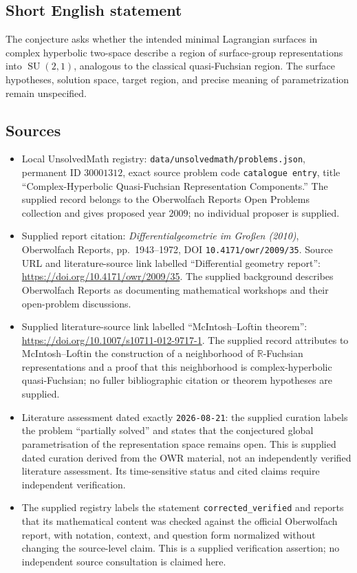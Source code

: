 \documentclass[11pt]{article}
\newcommand{\R}{\mathbb{R}}
\begin{document}
\subsection{Short English statement}
The conjecture asks whether the intended minimal Lagrangian surfaces in complex hyperbolic two-space describe a region of surface-group representations into \(\operatorname{SU}(2,1)\), analogous to the classical quasi-Fuchsian region. The surface hypotheses, solution space, target region, and precise meaning of parametrization remain unspecified.
\subsection{Sources}
\begin{itemize}
\item Local UnsolvedMath registry: \texttt{data/unsolvedmath/problems.json}, permanent ID \(30001312\), exact source problem code \texttt{catalogue entry}, title ``Complex-Hyperbolic Quasi-Fuchsian Representation Components.'' The supplied record belongs to the Oberwolfach Reports Open Problems collection and gives proposed year \(2009\); no individual proposer is supplied.
\item Supplied report citation: \emph{Differentialgeometrie im Großen (2010)}, Oberwolfach Reports, pp.~1943--1972, DOI \texttt{10.4171/owr/2009/35}. Source URL and literature-source link labelled ``Differential geometry report'': \url{https://doi.org/10.4171/owr/2009/35}. The supplied background describes Oberwolfach Reports as documenting mathematical workshops and their open-problem discussions.
\item Supplied literature-source link labelled ``McIntosh--Loftin theorem'': \url{https://doi.org/10.1007/s10711-012-9717-1}. The supplied record attributes to McIntosh--Loftin the construction of a neighborhood of \(\R\)-Fuchsian representations and a proof that this neighborhood is complex-hyperbolic quasi-Fuchsian; no fuller bibliographic citation or theorem hypotheses are supplied.
\item Literature assessment dated exactly \texttt{2026-08-21}: the supplied curation labels the problem ``partially solved'' and states that the conjectured global parametrisation of the representation space remains open. This is supplied dated curation derived from the OWR material, not an independently verified literature assessment. Its time-sensitive status and cited claims require independent verification.
\item The supplied registry labels the statement \texttt{corrected\_verified} and reports that its mathematical content was checked against the official Oberwolfach report, with notation, context, and question form normalized without changing the source-level claim. This is a supplied verification assertion; no independent source consultation is claimed here.
\end{itemize}
\end{document}
